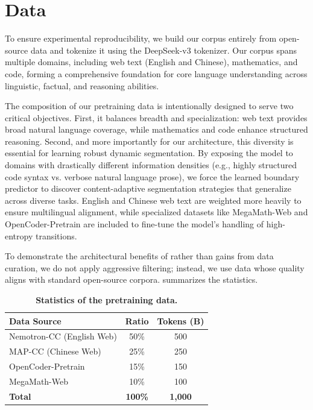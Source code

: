 
\section{Data}
To ensure experimental reproducibility, we build our corpus entirely from open-source data and tokenize it using the DeepSeek-v3 \cite{liu2024deepseek} tokenizer. Our corpus spans multiple domains, including web text (English and Chinese), mathematics, and code, forming a comprehensive foundation for core language understanding across linguistic, factual, and reasoning abilities.

The composition of our pretraining data is intentionally designed to serve two critical objectives. First, it balances breadth and specialization: web text provides broad natural language coverage, while mathematics and code enhance structured reasoning. Second, and more importantly for our architecture, this diversity is essential for learning robust dynamic segmentation. By exposing the model to domains with drastically different information densities (e.g., highly structured code syntax vs. verbose natural language prose), we force the learned boundary predictor to discover content-adaptive segmentation strategies that generalize across diverse tasks. English and Chinese web text are weighted more heavily to ensure multilingual alignment, while specialized datasets like MegaMath-Web and OpenCoder-Pretrain are included to fine-tune the model's handling of high-entropy transitions.

To demonstrate the architectural benefits of \ModelName{} rather than gains from data curation, we do not apply aggressive filtering; instead, we use data whose quality aligns with standard open-source corpora.  summarizes the statistics.

\begin{table}[ht]
\centering
\small
\caption{\textbf{Statistics of the pretraining data.}}
\label{tab:training_data_details}
\begin{tabular}{l|cc}
\toprule
\textbf{Data Source} & \textbf{Ratio} & \textbf{Tokens (B)} \\
\hline
Nemotron-CC \cite{su2024nemotron} (English Web) & 50\% & 500 \\
MAP-CC \cite{du2024chinese} (Chinese Web) & 25\% & 250 \\
OpenCoder-Pretrain \cite{Huang2024OpenCoderTO} & 15\% & 150 \\
MegaMath-Web \cite{zhou2025megamath} & 10\% & 100 \\
\hline
\textbf{Total} & \textbf{100\%} & \textbf{1,000} \\
\bottomrule
\end{tabular}
\end{table}



